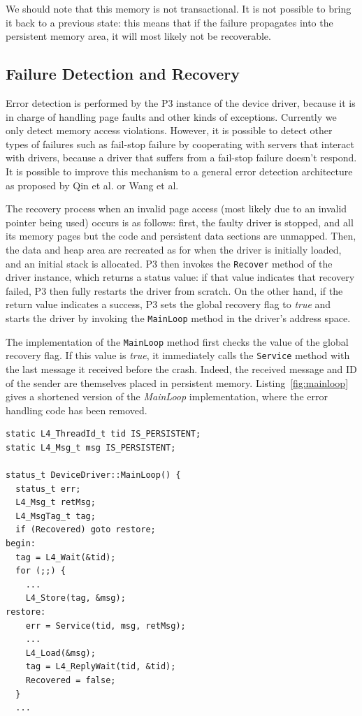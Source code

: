 \documentclass{report}
\begin{document}
We should note that this memory is not transactional. It is not possible to bring it back to a previous state: this means that if the failure propagates into the persistent memory area, it will most likely not be recoverable.

\subsection{Failure Detection and Recovery}
Error detection is performed by the P3 instance of the device driver, because it is in charge of handling page faults and other kinds of exceptions. Currently we only detect memory access violations.  However, it is possible to detect other types of failures such as fail-stop failure by cooperating with servers that interact with drivers, because a driver that suffers from a fail-stop failure doesn't respond.  It is possible to improve this mechanism to a general error detection architecture as proposed by Qin et al.\cite{Qin2007} or Wang et al\cite{Wang2006}.

The recovery process when an invalid page access (most likely due to an invalid pointer being used) occurs is as follows: first, the faulty driver is stopped, and all its memory pages but the code and persistent data sections are unmapped. Then, the data and heap area are recreated as for when the driver is initially loaded, and an initial stack is allocated. P3 then invokes the \texttt{Recover} method of the driver instance, which returns a status value: if that value indicates that recovery failed, P3 then fully restarts the driver from scratch. On the other hand, if the return value indicates a success, P3 sets the global recovery flag to \emph{true} and starts the driver by invoking the \texttt{MainLoop} method in the driver's address space.

The implementation of the \texttt{MainLoop} method first checks the value of the global recovery flag. If this value is \emph{true}, it immediately calls the \texttt{Service} method with the last message it received before the crash. Indeed, the received message and ID of the sender are themselves placed in persistent memory. Listing~\ref{fig:mainloop} gives a shortened version of the \emph{MainLoop} implementation, where the error handling code has been removed.

\begin{lstlisting}[style=nonumbers,caption=Shortened version of \texttt{MainLoop}.,label=fig:mainloop]
static L4_ThreadId_t tid IS_PERSISTENT;
static L4_Msg_t msg IS_PERSISTENT;

status_t DeviceDriver::MainLoop() {
  status_t err;
  L4_Msg_t retMsg;
  L4_MsgTag_t tag;
  if (Recovered) goto restore;
begin:
  tag = L4_Wait(&tid);
  for (;;) {
    ...
    L4_Store(tag, &msg);
restore:
    err = Service(tid, msg, retMsg);
    ...
    L4_Load(&msg);
    tag = L4_ReplyWait(tid, &tid);
    Recovered = false;
  }
  ...
\end{lstlisting}
\end{document}
